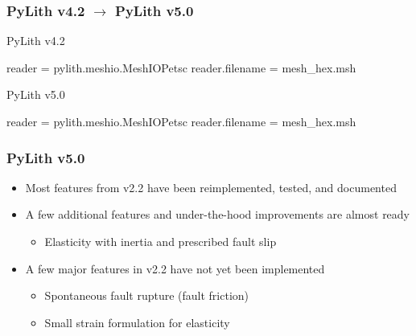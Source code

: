 \documentclass[aspectratio=169]{beamer}
\begin{document}
\begin{frame}[t,fragile]
  \frametitle{PyLith v4.2 $\rightarrow$ PyLith v5.0}

  \begin{minipage}[t]{0.45\textwidth}
    PyLith v4.2 \\

\begin{cfgcode}
  reader = pylith.meshio.MeshIOPetsc
  reader.filename = mesh_hex.msh
\end{cfgcode}
  \end{minipage}
  \hfill
  \begin{minipage}[t]{0.45\textwidth}
    PyLith v5.0 \\

\begin{cfgcode}
  reader = pylith.meshio.MeshIOPetsc
  reader.filename = mesh_hex.msh
\end{cfgcode}

  \end{minipage}

\end{frame}


\begin{frame}
  \frametitle{PyLith v5.0}
  \summary{}

  \begin{itemize}
  \item Most features from v2.2 have been reimplemented, tested, and documented
  \item A few additional features and under-the-hood improvements are almost ready
    \begin{itemize}
    \item Elasticity with inertia and prescribed fault slip
    \end{itemize}
  \item A few major features in v2.2 have not yet been implemented
    \begin{itemize}
    \item Spontaneous fault rupture (fault friction)
    \item Small strain formulation for elasticity
    \end{itemize}    
  \end{itemize}

\end{frame}
\end{document}
